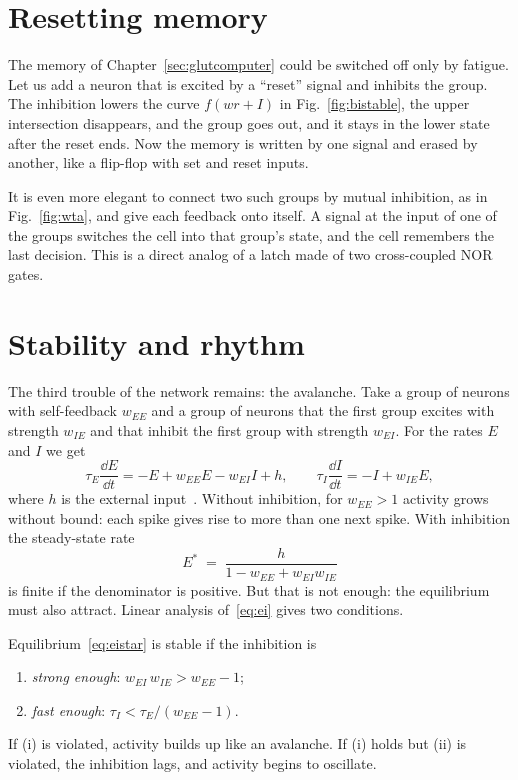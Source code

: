 \section{Resetting memory}

The memory of Chapter~\ref{sec:glutcomputer} could be switched off only by fatigue. Let us add a  neuron that is excited by a ``reset'' signal and inhibits the group. The inhibition lowers the curve $f(wr+I)$ in Fig.~\ref{fig:bistable}, the upper intersection disappears, and the group goes out, and it stays in the lower state after the reset ends. Now the memory is written by one signal and erased by another, like a flip-flop with set and reset inputs.

It is even more elegant to connect two such groups by mutual inhibition, as in Fig.~\ref{fig:wta}, and give each feedback onto itself. A signal at the input of one of the groups switches the cell into that group's state, and the cell remembers the last decision. This is a direct analog of a latch made of two cross-coupled NOR gates.

\section{Stability and rhythm}

The third trouble of the  network remains: the avalanche. Take a group of  neurons with self-feedback $w_{EE}$ and a group of  neurons that the first group excites with strength $w_{IE}$ and that inhibit the first group with strength $w_{EI}$. For the rates $E$ and $I$ we get
\begin{equation}
\tau_E\frac{\dd E}{\dd t} = -E + w_{EE}E - w_{EI}I + h, \qquad
\tau_I\frac{\dd I}{\dd t} = -I + w_{IE}E ,
\label{eq:ei}
\end{equation}
where $h$ is the external input~\cite{WilsonCowan1972}. Without inhibition, for $w_{EE}>1$ activity grows without bound: each spike gives rise to more than one next spike. With inhibition the steady-state rate
\begin{equation}
E^* \;=\; \frac{h}{1-w_{EE}+w_{EI}w_{IE}}
\label{eq:eistar}
\end{equation}
is finite if the denominator is positive. But that is not enough: the equilibrium must also attract. Linear analysis of~\eqref{eq:ei} gives two conditions.

\begin{keyblock}
\begin{proposition}
\label{prop:ei}
Equilibrium~\eqref{eq:eistar} is stable if the inhibition is
\begin{enumerate}
\item[(i)] \emph{strong enough}: $w_{EI}\,w_{IE} > w_{EE}-1$;
\item[(ii)] \emph{fast enough}: $\tau_I < \tau_E/(w_{EE}-1)$.
\end{enumerate}
If (i) is violated, activity builds up like an avalanche. If (i) holds but (ii) is violated, the inhibition lags, and activity begins to oscillate.
\end{proposition}
\end{keyblock}

